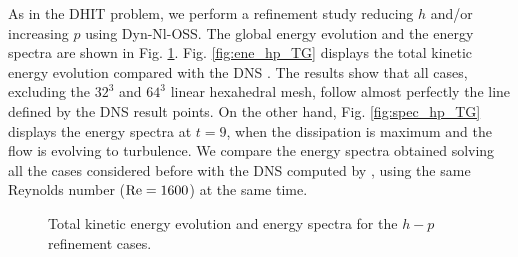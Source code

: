 As in the DHIT problem, we perform a refinement study reducing $h$ and/or increasing $p$ using  Dyn-Nl-OSS. 
The global energy evolution and the energy spectra are shown in Fig. \ref{fig:ene_spec_hp_TG}. Fig. \ref{fig:ene_hp_TG} displays the total kinetic energy evolution compared with the DNS \cite{brachet_small-scale_1983}. The results show that all cases, excluding the $32^3$ and $64^3$ linear hexahedral mesh, follow almost perfectly the line defined by the DNS result points. On the other hand, Fig. \ref{fig:spec_hp_TG} displays the energy spectra at $t=9$, when the dissipation is maximum and the flow is evolving to turbulence. We compare the energy spectra obtained solving all the cases considered before with the DNS computed by \cite{gassner_accuracy_2013}, using the same Reynolds number (${\rm Re}=1600$) at the same time. 
\begin{figure}[h!]
	\centering
	\caption{Total kinetic energy evolution and energy spectra for the $h-p$ refinement cases.}
	\label{fig:ene_spec_hp_TG}
\end{figure}


